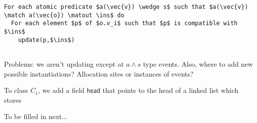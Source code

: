 \documentclass{article}
\newcommand{\atloc}[1]{\mathit{atloc}(#1)}
\newcommand{\delete}[1]{}
\newcommand{\p}[1]{\textsf{#1}}
\begin{document}
\begin{lstlisting}
For each atomic predicate $a(\vec{v}) \wedge s$ such that $a(\vec{v}) \match a(\vec{o}) \matout \ins$ do
  For each element $p$ of $o.v_i$ such that $p$ is compatible with $\ins$
    update(p,$\ins$)
   
\end{lstlisting}
\delete{
$a \wedge s \mid \atloc{l} \wedge s$
Let $A = \{o_1,\ldots,o_k\}$
For each $o_i$
  if $o_i.v_i$
For each $n$,
  let $A_{\text{new}} = \Linv(n) \cap A$
  let $A_{\text{old}} = \neg(\Linv(n)) \cap A$
    if $A_{\text{new}} = \emptyset$
      /* All variables involved are instantiated in this list */
      update_all(\p{ll}[n],a);
    else
      let }

Problems:  we aren't updating except at $a \wedge s$ type events.  Also, where to add new possible instantiations?  Allocation sites or instances of events?

To class $C_1$, we add a field $\p{head}$ that points to the head of a linked list which stores 

To be filled in next$\ldots$




\end{document}
